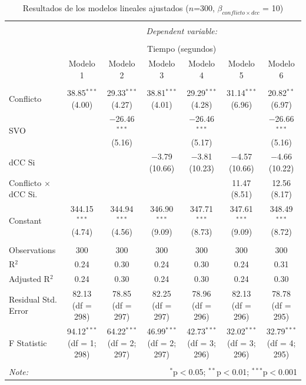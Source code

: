 \documentclass[
  spanish,
  10pt,
]{article}
\begin{document}
\begin{table}[H] \centering 
  \caption{Resultados de los modelos lineales ajustados ($n$=300, $\beta_{conflicto \times dcc}$ = 10)} 
  \label{} 
\tiny 
\begin{tabular}{@{\extracolsep{5pt}}lcccccc} 
\\[-1.8ex]\hline 
\hline \\[-1.8ex] 
 & \multicolumn{6}{c}{\textit{Dependent variable:}} \\ 
\cline{2-7} 
\\[-1.8ex] & \multicolumn{6}{c}{Tiempo (segundos)} \\ 
 & Modelo 1 & Modelo 2 & Modelo 3 & Modelo 4 & Modelo 5 & Modelo 6 \\ 
\hline \\[-1.8ex] 
 Conflicto & 38.85$^{***}$ (4.00) & 29.33$^{***}$ (4.27) & 38.81$^{***}$ (4.01) & 29.29$^{***}$ (4.28) & 31.14$^{***}$ (6.96) & 20.82$^{**}$ (6.97) \\ 
  SVO &  & $-$26.46$^{***}$ (5.16) &  & $-$26.46$^{***}$ (5.17) &  & $-$26.66$^{***}$ (5.16) \\ 
  dCC Si &  &  & $-$3.79 (10.66) & $-$3.81 (10.23) & $-$4.57 (10.66) & $-$4.66 (10.22) \\ 
  Conflicto $\times$ dCC Si. &  &  &  &  & 11.47 (8.51) & 12.56 (8.17) \\ 
  Constant & 344.15$^{***}$ (4.74) & 344.94$^{***}$ (4.56) & 346.90$^{***}$ (9.09) & 347.71$^{***}$ (8.73) & 347.61$^{***}$ (9.09) & 348.49$^{***}$ (8.72) \\ 
 \hline \\[-1.8ex] 
Observations & 300 & 300 & 300 & 300 & 300 & 300 \\ 
R$^{2}$ & 0.24 & 0.30 & 0.24 & 0.30 & 0.24 & 0.31 \\ 
Adjusted R$^{2}$ & 0.24 & 0.30 & 0.24 & 0.30 & 0.24 & 0.30 \\ 
Residual Std. Error & 82.13 (df = 298) & 78.85 (df = 297) & 82.25 (df = 297) & 78.96 (df = 296) & 82.13 (df = 296) & 78.78 (df = 295) \\ 
F Statistic & 94.12$^{***}$ (df = 1; 298) & 64.22$^{***}$ (df = 2; 297) & 46.99$^{***}$ (df = 2; 297) & 42.73$^{***}$ (df = 3; 296) & 32.02$^{***}$ (df = 3; 296) & 32.79$^{***}$ (df = 4; 295) \\ 
\hline 
\hline \\[-1.8ex] 
\textit{Note:}  & \multicolumn{6}{r}{$^{*}$p$<$0.05; $^{**}$p$<$0.01; $^{***}$p$<$0.001} \\ 
\end{tabular} 
\end{table}
\end{document}
